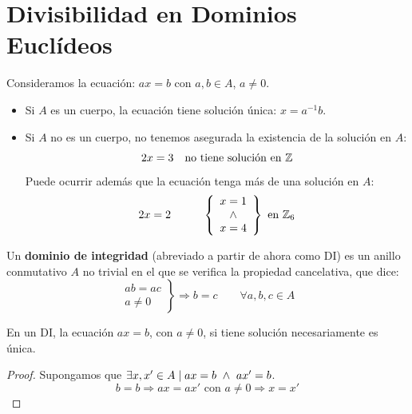 \chapter{Divisibilidad en Dominios Euclídeos}

Consideramos la ecuación: $ax=b$ con $a,b \in A$, $a \neq 0$.
\begin{itemize}
    \item Si $A$ es un cuerpo, la ecuación tiene solución única: $x=a^{-1}b$.
    \item Si $A$ no es un cuerpo, no tenemos asegurada la existencia de la solución en $A$:
        $$2x=3~~\text{ no tiene solución en }\mathbb Z$$
        Puede ocurrir además que la ecuación tenga más de una solución en $A$:
        $$2x=2\hspace{1cm}
        \left\{\begin{array}{c}
            x=1 \\ \ \land \  \\ x=4
        \end{array}\right\}
        \text{ en } \mathbb Z_6$$
\end{itemize}

\begin{definicion}
    Un \textbf{dominio de integridad} (abreviado a partir de ahora como DI) es un anillo conmutativo $A$ no trivial en el que
    se verifica la propiedad cancelativa, que dice:
    $$\left. \begin{array}{c}
            ab = ac \\
            a \neq 0
        \end{array} \right\} \Longrightarrow b=c\qquad \forall a,b,c\in A$$
\end{definicion}

\begin{lema}
En un DI, la ecuación $ax=b$, con $a\neq 0$, si tiene solución necesariamente es única.
\end{lema}
\begin{proof}
    Supongamos que $\exists x,x' \in A \mid ax = b \ \land \  ax' =b$.
    $$b=b \Longrightarrow ax = ax' \text{ con } a\neq 0 \Longrightarrow x = x'$$
\end{proof}

